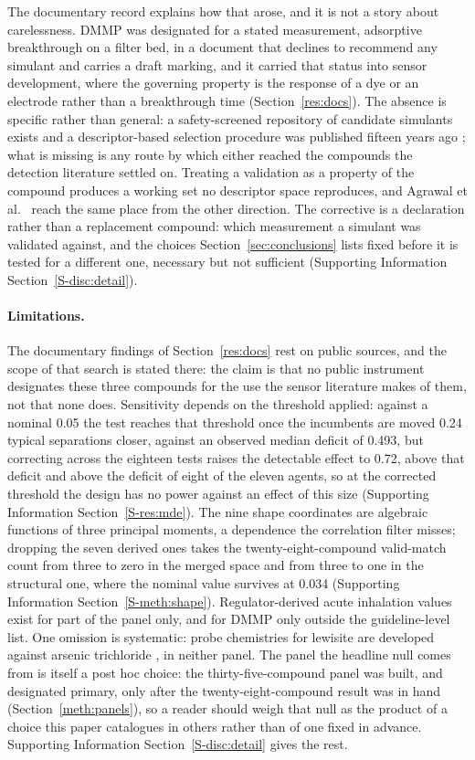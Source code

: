 \documentclass[journal=ancham,manuscript=article,margin=1in]{achemso}
\begin{document}
The documentary record explains how that arose, and it is not a story about
carelessness. DMMP was designated for a stated measurement, adsorptive
breakthrough on a filter bed, in a document that declines to recommend any
simulant and carries a draft marking, and it carried that status into sensor
development, where the governing
property is the response of a dye or an electrode rather than a breakthrough
time (Section~\ref{res:docs}). The absence is specific rather than general: a
safety-screened repository of candidate simulants exists \cite{james2021} and a
descriptor-based selection procedure was published fifteen years ago
\cite{lavoie2011}; what is missing is any route by which either reached the
compounds the detection literature settled on. Treating a validation as a
property of the compound produces a working set no descriptor space reproduces,
and Agrawal et al.~\cite{agrawal2018} reach the same place from the other
direction. The corrective is a declaration rather than a replacement compound:
which measurement a simulant was validated against, and the choices
Section~\ref{sec:conclusions} lists fixed before it is tested for a different
one, necessary but not sufficient (Supporting Information
Section~\ref{S-disc:detail}).

\paragraph{Limitations.} The documentary findings of Section~\ref{res:docs} rest
on public sources, and the scope of that search is stated there: the claim is
that no public instrument designates these three compounds for the use the
sensor literature makes of them, not that none does. Sensitivity depends on the
threshold applied: against a nominal 0.05 the test reaches that threshold once
the incumbents are moved 0.24 typical separations closer, against an observed
median deficit of 0.493, but correcting across the eighteen tests raises the
detectable effect to 0.72, above that deficit and above the deficit of eight of
the eleven agents, so at the corrected threshold the design has no power against
an effect of this size (Supporting Information Section~\ref{S-res:mde}). The
nine shape coordinates are algebraic functions
of three principal moments, a dependence the correlation filter misses; dropping
the seven derived ones takes the twenty-eight-compound valid-match count from
three to zero in the merged space and from three to one in the structural one,
where the nominal value survives at 0.034 (Supporting
Information Section~\ref{S-meth:shape}). Regulator-derived acute inhalation
values exist for part of the panel only, and for DMMP only outside the
guideline-level list. One omission is systematic: probe chemistries for lewisite
are developed against arsenic trichloride \cite{lee2016lewisite}, in neither
panel. The panel the headline null comes from is itself a post hoc choice: the
thirty-five-compound panel was built, and designated primary, only after the
twenty-eight-compound result was in hand (Section~\ref{meth:panels}), so a
reader should weigh that null as the product of a choice this paper catalogues
in others rather than of one fixed in advance. Supporting Information
Section~\ref{S-disc:detail} gives the rest.
\end{document}
